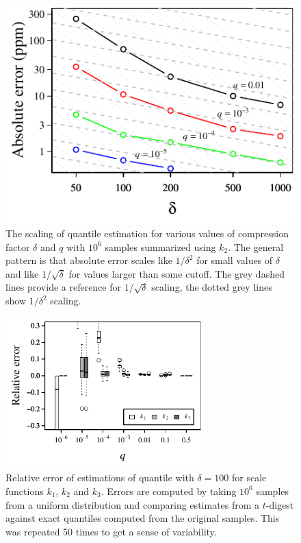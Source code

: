 \documentclass{vldb}
\begin{document}
\begin{figure}[h] %
   \centering
   \includegraphics[width=3.in]{figures/error-vs-compression-small.pdf} 
   \caption{The scaling of quantile estimation for various values of compression factor $\delta$ and $q$ with $10^6$ samples summarized using $k_2$. 
   The general pattern is that absolute error scales like $1/\delta^2$ for small values of $\delta$ and like $1/\sqrt{\delta}$ for values larger than some cutoff. The grey dashed lines provide a reference for $1/\sqrt{\delta}$ scaling, the dotted grey lines show $1/\delta^2$ scaling.   }
   \label{fig:accuracy-scaling}
\end{figure}
\begin{figure}[h] %
   \centering
   \includegraphics[width=3in]{figures/relative-error-one-panel.pdf} 
   \caption{Relative error of estimations of quantile with $\delta = 100$ for scale functions $k_1$, $k_2$ and $k_3$. Errors are computed by taking $10^6$ samples from a uniform distribution and comparing estimates from a $t$-digest against exact quantiles computed from the original samples. This was repeated 50 times to get a sense of variability.}
   \label{fig:by-scale}
\end{figure}
\end{document}
